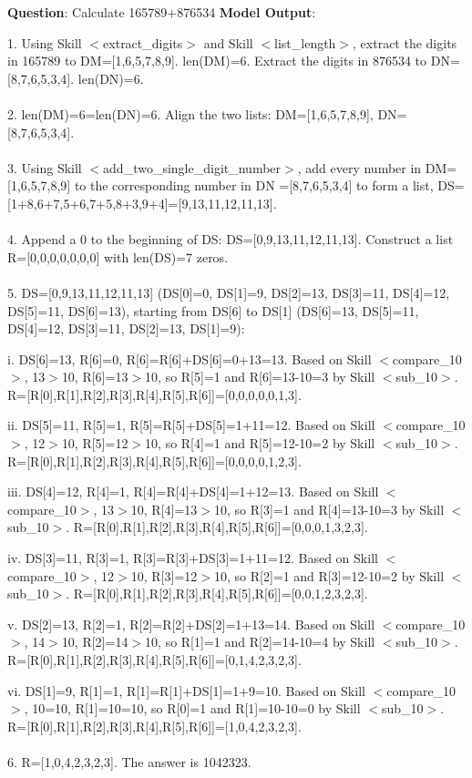 \documentclass{article} %
\begin{document}
\newpage

\begin{tcolorbox}[title = {Addition}, colback = Apricot!25!white, colframe = BrickRed!75!black,fontlower =\fontsize{9pt}{9pt}\selectfont] 
\textbf{Question}: Calculate 165789+876534
\tcblower
\textbf{Model Output}:

\quad

1. Using Skill $<$extract\_digits$>$ and Skill $<$list\_length$>$, extract the digits in 165789 to DM=[1,6,5,7,8,9].  len(DM)=6. Extract the digits in 876534 to DN=[8,7,6,5,3,4]. len(DN)=6. \\ \\
2. len(DM)=6=len(DN)=6. Align the two lists: DM=[1,6,5,7,8,9], DN=[8,7,6,5,3,4]. \\ \\
3. Using Skill $<$add\_two\_single\_digit\_number$>$, add every number in DM=[1,6,5,7,8,9] to the corresponding  number in DN =[8,7,6,5,3,4] to form a list, DS=[1+8,6+7,5+6,7+5,8+3,9+4]=[9,13,11,12,11,13]. \\ \\
4. Append a 0 to the beginning of DS: DS=[0,9,13,11,12,11,13]. Construct a list R=[0,0,0,0,0,0,0] with len(DS)=7 zeros. \\ \\
5. DS=[0,9,13,11,12,11,13] (DS[0]=0, DS[1]=9, DS[2]=13, DS[3]=11, DS[4]=12, DS[5]=11, DS[6]=13), starting from DS[6] to DS[1] (DS[6]=13, DS[5]=11, DS[4]=12, DS[3]=11, DS[2]=13, DS[1]=9): 

\quad

    \qquad i. DS[6]=13, R[6]=0, R[6]=R[6]+DS[6]=0+13=13. Based on Skill $<$compare\_10$>$, 13$>$10, R[6]=13$>$10, so R[5]=1 and R[6]=13-10=3 by Skill $<$sub\_10$>$. R=[R[0],R[1],R[2],R[3],R[4],R[5],R[6]]=[0,0,0,0,0,1,3]. 
    
    \qquad ii. DS[5]=11, R[5]=1, R[5]=R[5]+DS[5]=1+11=12. Based on Skill $<$compare\_10$>$, 12$>$10, R[5]=12$>$10, so R[4]=1 and R[5]=12-10=2 by Skill $<$sub\_10$>$. R=[R[0],R[1],R[2],R[3],R[4],R[5],R[6]]=[0,0,0,0,1,2,3]. 

    
    \qquad iii. DS[4]=12, R[4]=1, R[4]=R[4]+DS[4]=1+12=13. Based on Skill $<$compare\_10$>$, 13$>$10, R[4]=13$>$10, so R[3]=1 and R[4]=13-10=3 by Skill $<$sub\_10$>$. R=[R[0],R[1],R[2],R[3],R[4],R[5],R[6]]=[0,0,0,1,3,2,3]. 
    
    \qquad iv. DS[3]=11, R[3]=1, R[3]=R[3]+DS[3]=1+11=12. Based on Skill $<$compare\_10$>$, 12$>$10, R[3]=12$>$10, so R[2]=1 and R[3]=12-10=2 by Skill $<$sub\_10$>$. R=[R[0],R[1],R[2],R[3],R[4],R[5],R[6]]=[0,0,1,2,3,2,3]. 
    
    \qquad v. DS[2]=13, R[2]=1, R[2]=R[2]+DS[2]=1+13=14. Based on Skill $<$compare\_10$>$, 14$>$10, R[2]=14$>$10, so R[1]=1 and R[2]=14-10=4 by Skill $<$sub\_10$>$. R=[R[0],R[1],R[2],R[3],R[4],R[5],R[6]]=[0,1,4,2,3,2,3]. 
    
    \qquad vi. DS[1]=9, R[1]=1, R[1]=R[1]+DS[1]=1+9=10. Based on Skill $<$compare\_10$>$, 10=10, R[1]=10=10, so R[0]=1 and R[1]=10-10=0 by Skill $<$sub\_10$>$. R=[R[0],R[1],R[2],R[3],R[4],R[5],R[6]]=[1,0,4,2,3,2,3]. \\ \\
6. R=[1,0,4,2,3,2,3]. The answer is 1042323. 
\end{tcolorbox}
\end{document}
